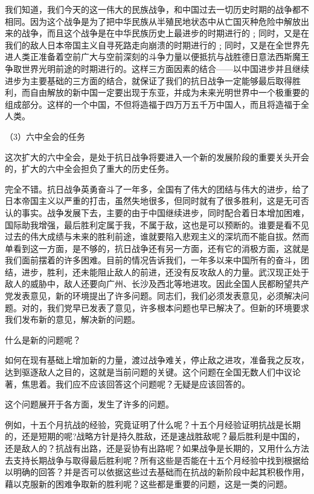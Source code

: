 \documentclass[UTF8, 12pt, a4paper]{ctexrep}
\begin{document}
我们知道，我们今天的这一伟大的民族战争，和中国过去一切历史时期的战争都不相同。因为这个战争是为了把中华民族从半殖民地状态中从亡国灭种危险中解放出来的战争，而且这个战争是在中华民族历史上最进步的时期进行的﹔同时，又是在我们的敌人日本帝国主义自寻死路走向崩溃的时期进行的﹔同时，又是在全世界先进人类正准备着空前广大与空前深刻的斗争力量以便抵抗与战胜德日意法西斯魔王争取世界光明前途的时期进行的。这样三方面因素的结合——以中国进步并且继续进步为主要基础的三方面的结合，就保证了我们的抗日战争一定能够最后取得胜利，而自由解放的新中国一定要出现于东亚，并成为未来光明世界中一个极重要的组成部分。这样的一个中国，不但将造福于四万万五千万中国人，而且将造福于全人类。

（3）六中全会的任务

这次扩大的六中全会，是处于抗日战争将要进入一个新的发展阶段的重要关头开会的，扩大的六中全会担负了重大的历史任务。

完全不错。抗日战争英勇奋斗了一年多，全国有了伟大的团结与伟大的进步，给了日本帝国主义以严重的打击，虽然失地很多，但同时就有了很多胜利，这是无可否认的事实。战争发展下去，主要的由于中国继续进步，同时配合着日本增加困难，国际助我增强，最后胜利定属于我，不属于敌，这也是可以预断的。谁要是看不见过去的伟大成绩与未来的胜利前途，谁就要陷入悲观主义的深坑而不能自拔。然而单看到这一方面，是不够的，抗日战争还有另一方面，还有它的消极方面，这就是我们面前摆着的许多困难。目前的情况告诉我们，一年多以来中国所有的奋斗，团结，进步，胜利，还未能阻止敌人的前进，还没有反攻敌人的力量。武汉现正处于敌人的威胁中，敌人还要向广州、长沙及西北等地进攻。因此全国人民都盼望共产党发表意见，新的环境提出了许多问题。同志们，我们必须发表意见，必须解决问题。对的，我们党早已发表了意见，许多根本问题也早已解决了。但新的环境要求我们发布新的意见，解决新的问题。

什么是新的问题呢？

如何在现有基础上增加新的力量，渡过战争难关，停止敌之进攻，准备我之反攻，达到驱逐敌人之目的，这就是当前问题的关键。这个问题在全国无数人们中议论著，焦思着。我们应不应该回答这个问题呢？无疑是应该回答的。

这个问题展开于各方面，发生了许多的问题。

例如，十五个月抗战的经验，究竟证明了什么呢？十五个月经验证明抗战是长期的，还是短期的呢?战略方针是持久胜敌，还是速战胜敌呢？最后胜利是中国的，还是敌人的？抗战有出路，还是妥协有出路呢？如果战争是长期的，又用什么方法去支持长期战争与取得最后胜利呢？所有这些是否能在十五个月经验中找到根据给以明确的回答？并是否可以依据这些过去基础而在抗战的新阶段中起其积极作用，藉以克服新的困难争取新的胜利呢？这些都是重要的问题，这是一类的问题。
\end{document}
